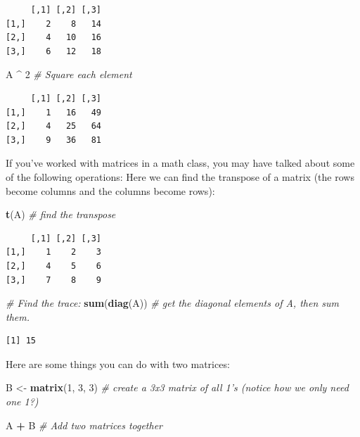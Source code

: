 \documentclass[
]{article}
\newenvironment{Shaded}{\begin{snugshade}}{\end{snugshade}}
\newcommand{\CommentTok}[1]{\textcolor[rgb]{0.56,0.35,0.01}{\textit{#1}}}
\newcommand{\DecValTok}[1]{\textcolor[rgb]{0.00,0.00,0.81}{#1}}
\newcommand{\KeywordTok}[1]{\textcolor[rgb]{0.13,0.29,0.53}{\textbf{#1}}}
\newcommand{\NormalTok}[1]{#1}
\newcommand{\OperatorTok}[1]{\textcolor[rgb]{0.81,0.36,0.00}{\textbf{#1}}}
\newcommand{\StringTok}[1]{\textcolor[rgb]{0.31,0.60,0.02}{#1}}
\begin{document}
\begin{verbatim}
     [,1] [,2] [,3]
[1,]    2    8   14
[2,]    4   10   16
[3,]    6   12   18
\end{verbatim}

\begin{Shaded}
\begin{Highlighting}[]
\NormalTok{A }\OperatorTok{^}\StringTok{ }\DecValTok{2}  \CommentTok{# Square each element }
\end{Highlighting}
\end{Shaded}

\begin{verbatim}
     [,1] [,2] [,3]
[1,]    1   16   49
[2,]    4   25   64
[3,]    9   36   81
\end{verbatim}

If you've worked with matrices in a math class, you may have talked about some of the following operations:
Here we can find the transpose of a matrix (the rows become columns and the columns become rows):

\begin{Shaded}
\begin{Highlighting}[]
\KeywordTok{t}\NormalTok{(A)  }\CommentTok{# find the transpose }
\end{Highlighting}
\end{Shaded}

\begin{verbatim}
     [,1] [,2] [,3]
[1,]    1    2    3
[2,]    4    5    6
[3,]    7    8    9
\end{verbatim}

\begin{Shaded}
\begin{Highlighting}[]
\CommentTok{# Find the trace:}
\KeywordTok{sum}\NormalTok{(}\KeywordTok{diag}\NormalTok{(A))  }\CommentTok{# get the diagonal elements of A, then sum them.}
\end{Highlighting}
\end{Shaded}

\begin{verbatim}
[1] 15
\end{verbatim}

Here are some things you can do with two matrices:

\begin{Shaded}
\begin{Highlighting}[]
\NormalTok{B <-}\StringTok{ }\KeywordTok{matrix}\NormalTok{(}\DecValTok{1}\NormalTok{, }\DecValTok{3}\NormalTok{, }\DecValTok{3}\NormalTok{)   }\CommentTok{# create a 3x3 matrix of all 1's (notice how we only need one 1?)}

\NormalTok{A }\OperatorTok{+}\StringTok{ }\NormalTok{B  }\CommentTok{# Add two matrices together}
\end{Highlighting}
\end{Shaded}
\end{document}
